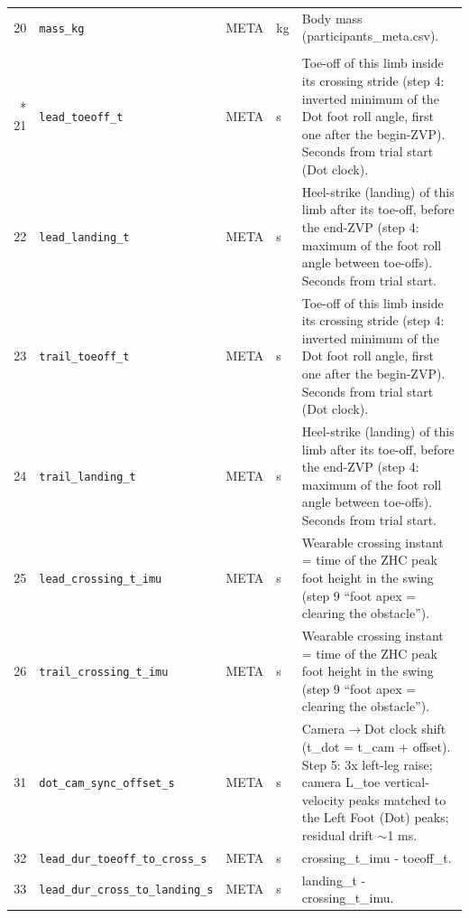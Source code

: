\begin{longtable}{@{}r p{3.6cm} p{1.55cm} p{1.15cm} p{8.6cm}@{}}
20 & \texttt{mass\_\allowbreak{}kg} & META & kg & Body mass (participants\_meta.csv). \\
\addlinespace
\multicolumn{5}{@{}l}{\textbf{Events, timing and durations (19)}} \\*
21 & \texttt{lead\_\allowbreak{}toeoff\_\allowbreak{}t} & META & s & Toe-off of this limb inside its crossing stride (step 4: inverted minimum of the Dot foot roll angle, first one after the begin-ZVP). Seconds from trial start (Dot clock). \\
22 & \texttt{lead\_\allowbreak{}landing\_\allowbreak{}t} & META & s & Heel-strike (landing) of this limb after its toe-off, before the end-ZVP (step 4: maximum of the foot roll angle between toe-offs). Seconds from trial start. \\
23 & \texttt{trail\_\allowbreak{}toeoff\_\allowbreak{}t} & META & s & Toe-off of this limb inside its crossing stride (step 4: inverted minimum of the Dot foot roll angle, first one after the begin-ZVP). Seconds from trial start (Dot clock). \\
24 & \texttt{trail\_\allowbreak{}landing\_\allowbreak{}t} & META & s & Heel-strike (landing) of this limb after its toe-off, before the end-ZVP (step 4: maximum of the foot roll angle between toe-offs). Seconds from trial start. \\
25 & \texttt{lead\_\allowbreak{}crossing\_\allowbreak{}t\_\allowbreak{}imu} & META & s & Wearable crossing instant = time of the ZHC peak foot height in the swing (step 9 ``foot apex = clearing the obstacle''). \\
26 & \texttt{trail\_\allowbreak{}crossing\_\allowbreak{}t\_\allowbreak{}imu} & META & s & Wearable crossing instant = time of the ZHC peak foot height in the swing (step 9 ``foot apex = clearing the obstacle''). \\
31 & \texttt{dot\_\allowbreak{}cam\_\allowbreak{}sync\_\allowbreak{}offset\_\allowbreak{}s} & META & s & Camera$\rightarrow$Dot clock shift (t\_dot = t\_cam + offset). Step 5: 3x left-leg raise; camera L\_toe vertical-velocity peaks matched to the Left Foot (Dot) peaks; residual drift $\sim$1 ms. \\
32 & \texttt{lead\_\allowbreak{}dur\_\allowbreak{}toeoff\_\allowbreak{}to\_\allowbreak{}cross\_\allowbreak{}s} & META & s & crossing\_t\_imu - toeoff\_t. \\
33 & \texttt{lead\_\allowbreak{}dur\_\allowbreak{}cross\_\allowbreak{}to\_\allowbreak{}landing\_\allowbreak{}s} & META & s & landing\_t - crossing\_t\_imu. \\

\end{longtable}
